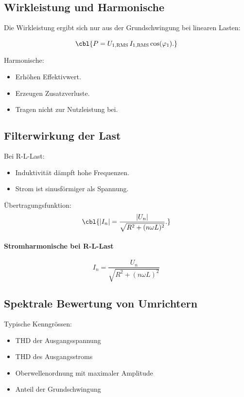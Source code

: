 \subsection{Wirkleistung und Harmonische}

Die Wirkleistung ergibt sich nur aus der Grundschwingung bei linearen Lasten:

\[
\cbl{P = U_{1,\mathrm{RMS}} \, I_{1,\mathrm{RMS}} \cos(\varphi_1).}
\]

Harmonische:
\begin{itemize}
    \item Erhöhen Effektivwert.
    \item Erzeugen Zusatzverluste.
    \item Tragen nicht zur Nutzleistung bei.
\end{itemize}


\subsection{Filterwirkung der Last}

Bei R-L-Last:
\begin{itemize}
    \item Induktivität dämpft hohe Frequenzen.
    \item Strom ist sinusförmiger als Spannung.
\end{itemize}

Übertragungsfunktion:
\[
\cbl{|I_n| = \frac{|U_n|}{\sqrt{R^2 + (n \omega L)^2}}.}
\]

\paragraph{Stromharmonische bei R-L-Last}
\[
I_n = \frac{U_n}{\sqrt{R^2 + (n\omega L)^2}}
\]


\subsection{Spektrale Bewertung von Umrichtern}

Typische Kenngrössen:
\begin{itemize}
    \item THD der Ausgangsspannung
    \item THD des Ausgangsstroms
    \item Oberwellenordnung mit maximaler Amplitude
    \item Anteil der Grundschwingung
\end{itemize}

